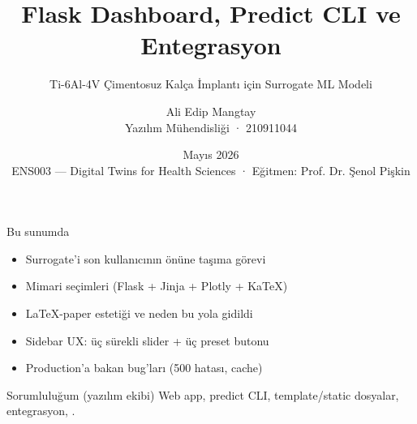 

\newcommand{\courseHeader}{ENS003 --- Digital Twins for Health Sciences}
\newcommand{\courseSubheader}{İstinye Üniversitesi · Müh. ve Doğa Bilimleri Fakültesi}
\newcommand{\instructor}{Eğitmen: Prof. Dr. Şenol Pişkin}
\newcommand{\projectTitle}{Ti-6Al-4V Çimentosuz Kalça İmplantı için Surrogate ML Modeli}

\title{Flask Dashboard, Predict CLI ve Entegrasyon}
\subtitle{\projectTitle}
\author{Ali Edip Mangtay \\ \small Yazılım Mühendisliği · 210911044}
\date{Mayıs 2026 \\ \scriptsize \courseHeader{} · \instructor}



\maketitle

\begin{frame}{Bu sunumda}
  \begin{itemize}
    \item Surrogate'i son kullanıcının önüne taşıma görevi
    \item Mimari seçimleri (Flask + Jinja + Plotly + KaTeX)
    \item LaTeX-paper estetiği ve neden bu yola gidildi
    \item Sidebar UX: üç sürekli slider + üç preset butonu
    \item Production'a bakan bug'ları (500 hatası, cache)
  \end{itemize}
  \vspace{0.4cm}
  \begin{block}{Sorumluluğum (yazılım ekibi)}
    Web app, predict CLI, template/static dosyalar, entegrasyon,
    .
  \end{block}
\end{frame}

